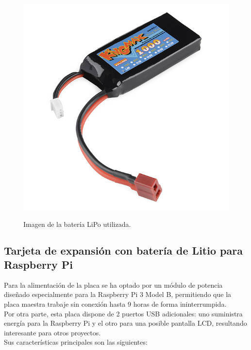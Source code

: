 \begin{figure}[H]
  \begin{center}
    \includegraphics[scale=0.3]{imagenes/robot/bateria-lipo.jpg}\\
    \caption{Imagen de la batería LiPo utilizada.}
  \end{center}
\end{figure}


\subsection{ Tarjeta de expansión con batería de Litio para Raspberry Pi }
\label{componente:bateria-expansion}

Para la alimentación de la placa se ha optado por un módulo de potencia diseñado especialmente para la Raspberry Pi 3 Model B, permitiendo que la placa maestra trabaje sin conexión hasta 9 horas
de forma ininterrumpida.\\

Por otra parte, esta placa dispone de 2 puertos USB adicionales: uno suministra energía para la Raspberry Pi y el otro para una posible pantalla LCD, resultando interesante para otros proyectos.\\

Sus características principales son las siguientes:

